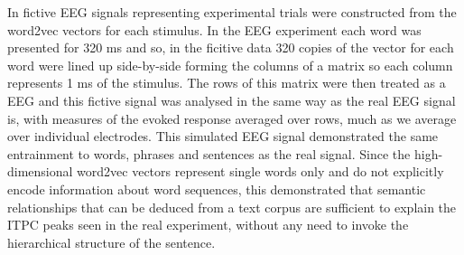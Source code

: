 \documentclass[11pt,a4wide]{article}
\newcommand{\citet}[1]{\cite{#1}}
\begin{document}
In \citet{FrankYang2018} fictive EEG signals representing experimental
trials were constructed from the word2vec vectors for each
stimulus. In the EEG experiment each word was presented for 320 ms and
so, in the ficitive data 320 copies of the vector for each word were
lined up side-by-side forming the columns of a matrix so each column
represents 1 ms of the stimulus. The rows of this matrix were then
treated as a EEG and this fictive signal was analysed in the same way
as the real EEG signal is, with measures of the evoked response
averaged over rows, much as we average over individual
electrodes. This simulated EEG signal demonstrated the same
entrainment to words, phrases and sentences as the real signal. Since
the high-dimensional word2vec vectors represent single words only and
do not explicitly encode information about word sequences, this
demonstrated that semantic relationships that can be deduced from a
text corpus are sufficient to explain the ITPC peaks seen in the real
experiment, without any need to invoke the hierarchical structure of
the sentence.
\end{document}
